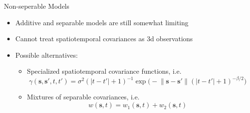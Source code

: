 \documentclass[11pt,ignorenonframetext,]{beamer}
\providecommand{\tightlist}{%
  \setlength{\itemsep}{0pt}\setlength{\parskip}{0pt}}
\begin{document}
\begin{frame}[t]{Non-seperable Models}
\protect\hypertarget{non-seperable-models}{}

\begin{itemize}
\tightlist
\item
  Additive and separable models are still somewhat limiting
\end{itemize}

\vspace{2mm}

\begin{itemize}
\tightlist
\item
  Cannot treat spatiotemporal covariances as 3d observations
\end{itemize}

\vspace{2mm}

\begin{itemize}
\item
  Possible alternatives:

  \begin{itemize}
  \item
    Specialized spatiotemporal covariance functions, i.e.~\[ 
    \gamma(\symbf{s},\symbf{s}', t,t') 
    = \sigma^2 (\lvert t - t'\rvert+1)^{-1} \exp\big(-\lVert\symbf{s}-\symbf{s}'\rVert (\lvert t-t' \rvert + 1)^{-\beta/2}\big)
    \]
  \item
    Mixtures of separable covariances, i.e.~\[
    w(\symbf{s},t) = w_1(\symbf{s},t) + w_2(\symbf{s},t)
    \]
  \end{itemize}
\end{itemize}

\end{frame}
\end{document}
